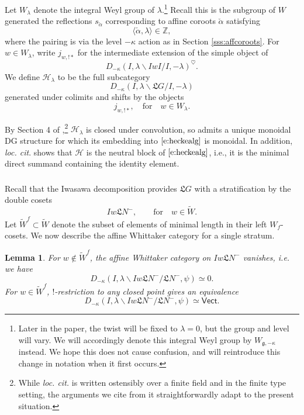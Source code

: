 \documentclass[11pt,reqno]{amsart}
\newcommand{\sH}{\mathscr{H}}
\newcommand{\aff}{\operatorname{aff}}
\newcommand{\fL}{\mathfrak{L}}
\newcommand{\halpha}{\check{\alpha}}
\newcommand{\fg}{\mathfrak{g}}
\newtheorem{lemma}[subsubsection]{Lemma}
\theoremstyle{remark}
\numberwithin{equation}{section}
\newcommand{\Vect}{\mathsf{Vect}}
\newcommand{\Whit}{\mathsf{Whit}}
\begin{document}
Let $W_\lambda$ denote the integral Weyl group of $\lambda$.\footnote{Later in 
the paper, the twist will be fixed to $\lambda = 0$, 
but the group and level will vary. We will accordingly denote this integral 
Weyl group by $W_{\fg, -\kappa}$ instead. We hope this does not cause 
confusion, and will reintroduce this change in notation when it first occurs.} 
Recall 
this 
is the subgroup of $W$ generated the reflections $s_{\halpha}$ 
corresponding to affine coroots $\halpha$ satisfying \[\langle \halpha, \lambda 
\rangle \in 
\mathbb{Z},\]where the pairing is via the level $-\kappa$ action as in 
Section \ref{sss:affcoroots}. For $w \in W_\lambda$, write $j_{w, !*}$ for the 
intermediate 
extension of the 
simple object of 
%
\[
D_{-\kappa}(I, \lambda \backslash IwI / I, -\lambda)^\heartsuit.
\]
%
We define $\sH_\lambda$ to be the full subcategory 
%
\begin{equation} \label{e:heckealg} 
D_{-\kappa}(I, \lambda \backslash \fL G / 
I, -\lambda)
\end{equation}
%
generated under colimits and shifts by the objects
%
\[ j_{w, !*}, \quad \text{for} \quad  w \in W_\lambda.\]
%

By Section 4 of \cite{ly},\footnote{While {\em loc. cit.} is written ostensibly 
over a finite field and in the finite type setting, the arguments we cite from
it straightforwardly adapt to the present situation.} $\sH_\lambda$ is closed 
under convolution,
so admits a unique monoidal DG structure for which its embedding
into $\eqref{e:heckealg}$ is monoidal. In addition, \emph{loc. cit}. 
shows that $\sH$ is the neutral block of 
$\eqref{e:heckealg}$, i.e., it is the minimal direct summand containing the 
identity element.

\subsubsection{}
\label{sss:iwd}

Recall that the Iwasawa decomposition provides $\fL G$ with
a stratification by the double cosets
%
\[I w \fL N^-, \quad \quad \text{for}  \quad w \in \widetilde{W}.\] 
%
Let $\widetilde{W}^f \subset \widetilde{W}$ denote the subset
of elements of minimal length in their left $W_f$-cosets. We now describe the 
affine Whittaker category for a single stratum. 


\begin{lemma} For $w \notin \widetilde{W}^f$, the affine Whittaker category 
on 
$Iw \fL N^-$ vanishes, i.e. we have %
	\[ D_{-\kappa}(I, \lambda \backslash I w \fL N^-/\fL N^-, \psi) \simeq 0.
	\]
	For $w \in \widetilde{W}^f$, $!$-restriction to any closed point gives an 
	equivalence
	\[
	D_{-\kappa}(I, \lambda \backslash I w \fL N^- / \fL N^-, \psi) \simeq \Vect.
	\]
\end{lemma}
\end{document}

